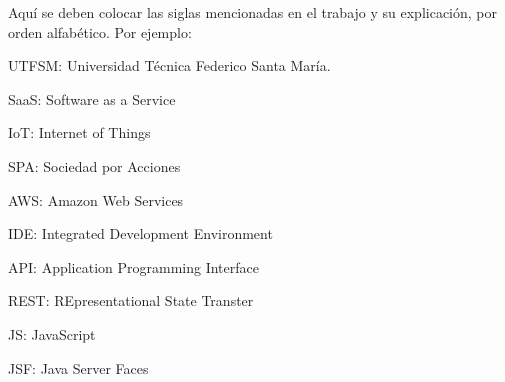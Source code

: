 
Aquí se deben colocar las siglas mencionadas en el trabajo y su explicación, por orden alfabético. Por ejemplo: \\

{\setlength{\parskip}{0cm} %
UTFSM: Universidad Técnica Federico Santa María.

SaaS: Software as a Service

IoT: Internet of Things

SPA: Sociedad por Acciones

AWS: Amazon Web Services

IDE: Integrated Development Environment

API: Application Programming Interface

REST: REpresentational State Transter

JS: JavaScript

JSF: Java Server Faces
}